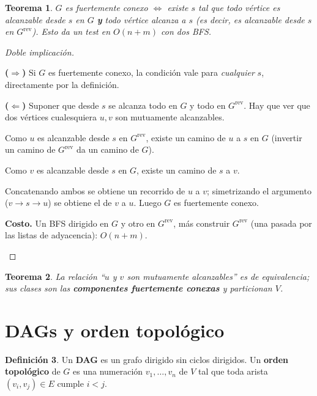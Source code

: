 \documentclass[11pt,a4paper]{article}
\theoremstyle{plain}
\newtheorem{teorema}{Teorema}[section]
\theoremstyle{definition}
\newtheorem{definicion}[teorema]{Definición}
\theoremstyle{remark}
\begin{document}
\begin{teorema}
$G$ es fuertemente conexo $\iff$ existe $s$ tal que todo vértice es alcanzable desde
$s$ en $G$ \textbf{y} todo vértice alcanza a $s$ (es decir, es alcanzable desde $s$ en
$G^{\mathrm{rev}}$). Esto da un test en $O(n+m)$ con dos BFS.
\end{teorema}
\begin{proof}[Doble implicación]
\begin{pasos}
\item \textbf{($\Rightarrow$)} Si $G$ es fuertemente conexo, la condición vale para
\emph{cualquier} $s$, directamente por la definición.
\item \textbf{($\Leftarrow$)} Suponer que desde $s$ se alcanza todo en $G$ y todo en
$G^{\mathrm{rev}}$. Hay que ver que dos vértices cualesquiera $u,v$ son mutuamente
alcanzables.
\item Como $u$ es alcanzable desde $s$ en $G^{\mathrm{rev}}$, existe un camino de $u$ a
$s$ en $G$ (invertir un camino de $G^{\mathrm{rev}}$ da un camino de $G$).
\item Como $v$ es alcanzable desde $s$ en $G$, existe un camino de $s$ a $v$.
\item Concatenando ambos se obtiene un recorrido de $u$ a $v$; simetrizando el argumento
($v\to s\to u$) se obtiene el de $v$ a $u$. Luego $G$ es fuertemente conexo.
\item \textbf{Costo.} Un BFS dirigido en $G$ y otro en $G^{\mathrm{rev}}$, más construir
$G^{\mathrm{rev}}$ (una pasada por las listas de adyacencia): $O(n+m)$. \qedhere
\end{pasos}
\end{proof}

\begin{teorema}
La relación ``$u$ y $v$ son mutuamente alcanzables'' es de equivalencia; sus clases son
las \textbf{componentes fuertemente conexas} y particionan $V$.
\end{teorema}

\section{DAGs y orden topológico}

\begin{definicion}
Un \textbf{DAG} es un grafo dirigido sin ciclos dirigidos. Un \textbf{orden
topológico} de $G$ es una numeración $v_1,\dots,v_n$ de $V$ tal que toda arista
$(v_i,v_j)\in E$ cumple $i<j$.
\end{definicion}
\end{document}

